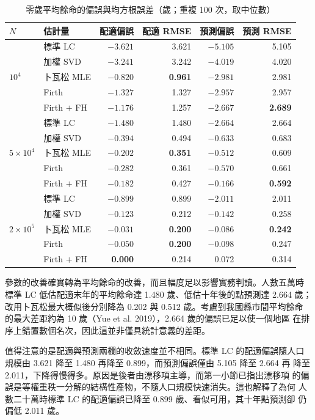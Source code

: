 \documentclass[UTF8, fontset=macnew, a4paper, 12pt]{ctexart}
\begin{document}
\begin{table}[H]
\centering
\caption{零歲平均餘命的偏誤與均方根誤差（歲；重複 100 次，取中位數）}
\small
\begin{tabular}{llrrrr}
\toprule
$N$ & 估計量 & 配適偏誤 & 配適 RMSE & 預測偏誤 & 預測 RMSE\\
\midrule
\multirow{5}{*}{$10^4$}
 & 標準 LC     & $-3.621$ & 3.621 & $-5.105$ & 5.105\\
 & 加權 SVD    & $-3.241$ & 3.242 & $-4.019$ & 4.020\\
 & 卜瓦松 MLE  & \textbf{$-0.820$} & \textbf{0.961} & $-2.981$ & 2.981\\
 & Firth       & $-1.327$ & 1.327 & $-2.957$ & 2.957\\
 & Firth $+$ FH & $-1.176$ & 1.257 & \textbf{$-2.667$} & \textbf{2.689}\\
\midrule
\multirow{5}{*}{$5\times10^4$}
 & 標準 LC     & $-1.480$ & 1.480 & $-2.664$ & 2.664\\
 & 加權 SVD    & $-0.394$ & 0.494 & $-0.633$ & 0.683\\
 & 卜瓦松 MLE  & $-0.202$ & \textbf{0.351} & $-0.512$ & 0.609\\
 & Firth       & $-0.282$ & 0.361 & $-0.570$ & 0.661\\
 & Firth $+$ FH & \textbf{$-0.182$} & 0.427 & \textbf{$-0.166$} & \textbf{0.592}\\
\midrule
\multirow{5}{*}{$2\times10^5$}
 & 標準 LC     & $-0.899$ & 0.899 & $-2.011$ & 2.011\\
 & 加權 SVD    & $-0.123$ & 0.212 & $-0.142$ & 0.258\\
 & 卜瓦松 MLE  & $-0.031$ & \textbf{0.200} & \textbf{$-0.086$} & \textbf{0.242}\\
 & Firth       & $-0.050$ & \textbf{0.200} & $-0.098$ & 0.247\\
 & Firth $+$ FH & \textbf{0.000} & 0.214 & 0.072 & 0.314\\
\bottomrule
\end{tabular}
\label{tab:e0bias}
\end{table}

參數的改善確實轉為平均餘命的改善，而且幅度足以影響實務判讀。人數五萬時
標準 LC 低估配適末年的平均餘命達 1.480 歲、低估十年後的點預測達 2.664 歲；
改用卜瓦松最大概似後分別降為 0.202 與 0.512 歲。考慮到我國縣市間平均餘命
的最大差距約為 10 歲（Yue et al. 2019），2.664 歲的偏誤已足以使一個地區
在排序上錯置數個名次，因此這並非僅具統計意義的差距。

值得注意的是配適與預測兩欄的收斂速度並不相同。標準 LC 的配適偏誤隨人口
規模由 3.621 降至 1.480 再降至 0.899，而預測偏誤僅由 5.105 降至 2.664 再
降至 2.011，下降得慢得多。原因是後者由漂移項主導，而第一小節已指出漂移項
的偏誤是等權重秩一分解的結構性產物，不隨人口規模快速消失。這也解釋了為何
人數二十萬時標準 LC 的配適偏誤已降至 0.899 歲、看似可用，其十年點預測卻
仍偏低 2.011 歲。
\end{document}
